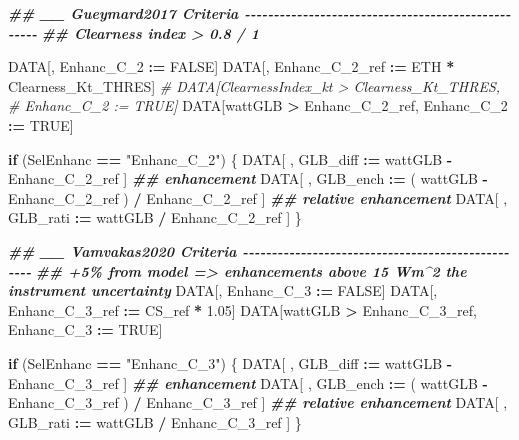 \documentclass[
  10pt,
  a4paper,oneside]{article}
\newenvironment{Shaded}{\begin{snugshade}}{\end{snugshade}}
\newcommand{\CommentTok}[1]{\textcolor[rgb]{0.56,0.35,0.01}{\textit{#1}}}
\newcommand{\ConstantTok}[1]{\textcolor[rgb]{0.56,0.35,0.01}{#1}}
\newcommand{\ControlFlowTok}[1]{\textcolor[rgb]{0.13,0.29,0.53}{\textbf{#1}}}
\newcommand{\DocumentationTok}[1]{\textcolor[rgb]{0.56,0.35,0.01}{\textbf{\textit{#1}}}}
\newcommand{\FloatTok}[1]{\textcolor[rgb]{0.00,0.00,0.81}{#1}}
\newcommand{\NormalTok}[1]{#1}
\newcommand{\SpecialCharTok}[1]{\textcolor[rgb]{0.81,0.36,0.00}{\textbf{#1}}}
\newcommand{\StringTok}[1]{\textcolor[rgb]{0.31,0.60,0.02}{#1}}
\begin{document}
\begin{Shaded}
\begin{Highlighting}[]
\DocumentationTok{\#\# \_\_ Gueymard2017 Criteria  {-}{-}{-}{-}{-}{-}{-}{-}{-}{-}{-}{-}{-}{-}{-}{-}{-}{-}{-}{-}{-}{-}{-}{-}{-}{-}{-}{-}{-}{-}{-}{-}{-}{-}{-}{-}{-}{-}{-}{-}{-}{-}{-}{-}{-}{-}{-}{-}{-}{-}{-}}
\DocumentationTok{\#\# Clearness index \textgreater{} 0.8 / 1}

\NormalTok{DATA[, Enhanc\_C\_2 }\SpecialCharTok{:=} \ConstantTok{FALSE}\NormalTok{]}
\NormalTok{DATA[, Enhanc\_C\_2\_ref }\SpecialCharTok{:=}\NormalTok{ ETH }\SpecialCharTok{*}\NormalTok{ Clearness\_Kt\_THRES]}
\CommentTok{\# DATA[ClearnessIndex\_kt \textgreater{} Clearness\_Kt\_THRES,}
\CommentTok{\#      Enhanc\_C\_2 := TRUE]}
\NormalTok{DATA[wattGLB }\SpecialCharTok{\textgreater{}}\NormalTok{ Enhanc\_C\_2\_ref,}
\NormalTok{     Enhanc\_C\_2 }\SpecialCharTok{:=} \ConstantTok{TRUE}\NormalTok{]}

\ControlFlowTok{if}\NormalTok{ (SelEnhanc }\SpecialCharTok{==} \StringTok{"Enhanc\_C\_2"}\NormalTok{) \{}
\NormalTok{    DATA[ , GLB\_diff }\SpecialCharTok{:=}\NormalTok{   wattGLB }\SpecialCharTok{{-}}\NormalTok{ Enhanc\_C\_2\_ref                    ] }\DocumentationTok{\#\# enhancement}
\NormalTok{    DATA[ , GLB\_ench }\SpecialCharTok{:=}\NormalTok{ ( wattGLB }\SpecialCharTok{{-}}\NormalTok{ Enhanc\_C\_2\_ref ) }\SpecialCharTok{/}\NormalTok{ Enhanc\_C\_2\_ref ] }\DocumentationTok{\#\# relative enhancement}
\NormalTok{    DATA[ , GLB\_rati }\SpecialCharTok{:=}\NormalTok{   wattGLB }\SpecialCharTok{/}\NormalTok{ Enhanc\_C\_2\_ref                    ]}
\NormalTok{\}}



\DocumentationTok{\#\# \_\_ Vamvakas2020  Criteria  {-}{-}{-}{-}{-}{-}{-}{-}{-}{-}{-}{-}{-}{-}{-}{-}{-}{-}{-}{-}{-}{-}{-}{-}{-}{-}{-}{-}{-}{-}{-}{-}{-}{-}{-}{-}{-}{-}{-}{-}{-}{-}{-}{-}{-}{-}{-}{-}{-}{-}}
\DocumentationTok{\#\# +5\% from model =\textgreater{} enhancements above 15 Wm\^{}2 the instrument uncertainty}
\NormalTok{DATA[, Enhanc\_C\_3 }\SpecialCharTok{:=} \ConstantTok{FALSE}\NormalTok{]}
\NormalTok{DATA[, Enhanc\_C\_3\_ref }\SpecialCharTok{:=}\NormalTok{ CS\_ref }\SpecialCharTok{*} \FloatTok{1.05}\NormalTok{]}
\NormalTok{DATA[wattGLB }\SpecialCharTok{\textgreater{}}\NormalTok{ Enhanc\_C\_3\_ref,}
\NormalTok{     Enhanc\_C\_3 }\SpecialCharTok{:=} \ConstantTok{TRUE}\NormalTok{]}

\ControlFlowTok{if}\NormalTok{ (SelEnhanc }\SpecialCharTok{==} \StringTok{"Enhanc\_C\_3"}\NormalTok{) \{}
\NormalTok{    DATA[ , GLB\_diff }\SpecialCharTok{:=}\NormalTok{   wattGLB }\SpecialCharTok{{-}}\NormalTok{ Enhanc\_C\_3\_ref                    ] }\DocumentationTok{\#\# enhancement}
\NormalTok{    DATA[ , GLB\_ench }\SpecialCharTok{:=}\NormalTok{ ( wattGLB }\SpecialCharTok{{-}}\NormalTok{ Enhanc\_C\_3\_ref ) }\SpecialCharTok{/}\NormalTok{ Enhanc\_C\_3\_ref ] }\DocumentationTok{\#\# relative enhancement}
\NormalTok{    DATA[ , GLB\_rati }\SpecialCharTok{:=}\NormalTok{   wattGLB }\SpecialCharTok{/}\NormalTok{ Enhanc\_C\_3\_ref                    ]}
\NormalTok{\}}
\end{Highlighting}
\end{Shaded}
\end{document}
